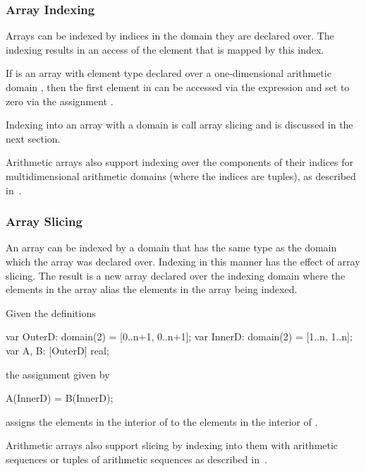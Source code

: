 \subsubsection{Array Indexing}
\label{Array_Indexing}

Arrays can be indexed by indices in the domain they are declared over.
The indexing results in an access of the element that is mapped by
this index.

\begin{example}
If  is an array with element type  declared over a
one-dimensional arithmetic domain \chpl{[1..n]}, then the first
element in  can be accessed via the expression  and
set to zero via the assignment .
\end{example}

Indexing into an array with a domain is call array slicing and is
discussed in the next section.

Arithmetic arrays also support indexing over the components of their
indices for multidimensional arithmetic domains (where the indices are
tuples), as described in~.

\subsubsection{Array Slicing}
\label{Array_Slicing}

An array can be indexed by a domain that has the same type as the
domain which the array was declared over.  Indexing in this manner has
the effect of array slicing.  The result is a new array declared over
the indexing domain where the elements in the array alias the elements
in the array being indexed.

\begin{example}
Given the definitions
\begin{chapel}
var OuterD: domain(2) = [0..n+1, 0..n+1];
var InnerD: domain(2) = [1..n, 1..n];
var A, B: [OuterD] real;
\end{chapel}
the assignment given by
\begin{chapel}
A(InnerD) = B(InnerD);
\end{chapel}
assigns the elements in the interior of  to the elements in
the interior of .
\end{example}

Arithmetic arrays also support slicing by indexing into them with
arithmetic sequences or tuples of arithmetic sequences as described
in~.

